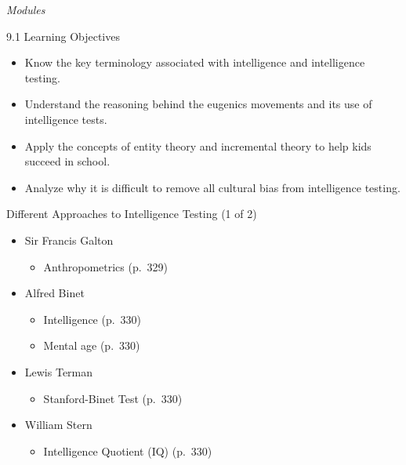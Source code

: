 \documentclass[
]{book}
\providecommand{\tightlist}{%
  \setlength{\itemsep}{0pt}\setlength{\parskip}{0pt}}
\begin{document}
\begin{reflect}
\emph{Modules}

9.1 Learning Objectives

\begin{itemize}
\tightlist
\item
  Know the key terminology associated with intelligence and intelligence testing.\\
\item
  Understand the reasoning behind the eugenics movements and its use of intelligence tests.\\
\item
  Apply the concepts of entity theory and incremental theory to help kids succeed in school.\\
\item
  Analyze why it is difficult to remove all cultural bias from intelligence testing.
\end{itemize}

Different Approaches to Intelligence Testing (1 of 2)

\begin{itemize}
\tightlist
\item
  Sir Francis Galton

  \begin{itemize}
  \tightlist
  \item
    Anthropometrics (p.~329)\\
  \end{itemize}
\item
  Alfred Binet

  \begin{itemize}
  \tightlist
  \item
    Intelligence (p.~330)\\
  \item
    Mental age (p.~330)\\
  \end{itemize}
\item
  Lewis Terman

  \begin{itemize}
  \tightlist
  \item
    Stanford-Binet Test (p.~330)\\
  \end{itemize}
\item
  William Stern

  \begin{itemize}
  \tightlist
  \item
    Intelligence Quotient (IQ) (p.~330)
  \end{itemize}
\end{itemize}


\end{reflect}
\end{document}
